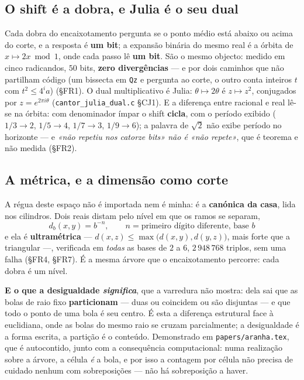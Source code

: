 \documentclass[11pt,a4paper]{article}
\newcommand{\code}[1]{\texttt{\small #1}}
\begin{document}
\subsection*{O shift é a dobra, e Julia é o seu dual}

Cada dobra do encaixotamento pergunta se o ponto médio está abaixo ou acima do
corte, e a resposta é \textbf{um bit}; a expansão binária do mesmo real é a
órbita de $x\mapsto2x\bmod1$, onde cada passo lê \textbf{um bit}. São o mesmo
objecto: medido em cinco radicandos, $50$ bits, \textbf{zero divergências} ---
e por dois caminhos que não partilham código (um bissecta em \code{Qz} e
pergunta ao corte, o outro conta inteiros $t$ com $t^{2}\le4^{i}a$) (§FR1).
O dual multiplicativo é Julia: $\theta\mapsto2\theta$ é $z\mapsto z^{2}$,
conjugados por $z=e^{2\pi i\theta}$ (\code{cantor\_julia\_dual.c} §CJ1). E a
diferença entre racional e real lê-se na órbita: com denominador ímpar o shift
\textbf{cicla}, com o período exibido ($1/3\to2$, $1/5\to4$, $1/7\to3$,
$1/9\to6$); a palavra de $\sqrt2$ não exibe período no horizonte --- e
\emph{«não repetiu nos catorze bits» não é «não repete»}, que é teorema e não
medida (§FR2).

\subsection*{A métrica, e a dimensão como corte}

A régua deste espaço não é importada nem é minha: é a \textbf{canónica da casa},
lida nos cilindros. Dois reais distam pelo nível em que os ramos se separam,
\[
\boxed{\;d_b(x,y)=b^{-n},\qquad n=\text{primeiro dígito diferente, base }b\;}
\]
e ela é \textbf{ultramétrica} --- $d(x,z)\le\max\bigl(d(x,y),d(y,z)\bigr)$, mais
forte que a triangular ---, verificada em \emph{todas} as bases de $2$ a $6$,
$2\,948\,768$ triplos, sem uma falha (§FR4, §FR7). É a mesma árvore que o
encaixotamento percorre: cada dobra é um nível.

\medskip\noindent\textbf{E o que a desigualdade \emph{significa}}, que a
varredura não mostra: dela sai que as bolas de raio fixo \textbf{particionam} ---
duas ou coincidem ou são disjuntas --- e que todo o ponto de uma bola é seu
centro. É esta a diferença estrutural face à euclidiana, onde as bolas do mesmo
raio se cruzam parcialmente; a desigualdade é a forma escrita, a partição é o
conteúdo. Demonstrado em \code{papers/aranha.tex}, que é autocontido, junto com
a consequência computacional: numa realização sobre a árvore, a célula
\emph{é} a bola, e por isso a contagem por célula não precisa de cuidado nenhum
com sobreposições --- não há sobreposição a haver.
\end{document}
